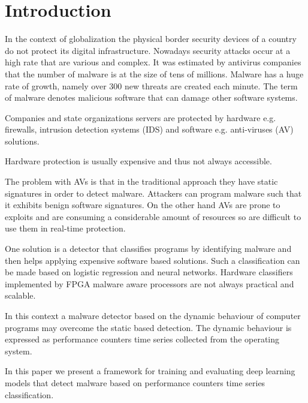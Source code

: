 \documentclass[conference]{IEEEtran}
\begin{document}

\section{Introduction}
\label{sec:introduction}
In the context of globalization the physical border security devices of a country do not protect its digital infrastructure. Nowadays security attacks occur at a high rate that are various and complex. It was estimated by antivirus companies that the number of malware is at the size of tens of millions. Malware has a huge rate of growth, namely over 300 new threats are created each minute.
The term of malware denotes malicious software that can damage other software systems.

Companies and state organizations servers are protected by hardware e.g. firewalls, intrusion detection systems (IDS) and software e.g. anti-viruses (AV) solutions.

Hardware protection is usually expensive and thus not always accessible.

The problem with AVs is that in the traditional approach they have static signatures in order to detect malware. Attackers can program malware such that it exhibits benign software signatures. On the other hand AVs are prone to exploits and are consuming a considerable amount of resources so are difficult to use them in real-time protection.

One solution is a detector that classifies programs by identifying malware and then helps applying expensive software based solutions. Such a classification can be made based on logistic regression and neural networks. Hardware classifiers implemented by FPGA malware aware processors are not always practical and scalable.

In this context a malware detector based on the dynamic behaviour of computer programs may overcome the static based detection. The dynamic behaviour is expressed as performance counters time series collected from the operating system.

In this paper we present a framework for training and evaluating deep learning models that detect malware based on performance counters time series classification.
\end{document}
